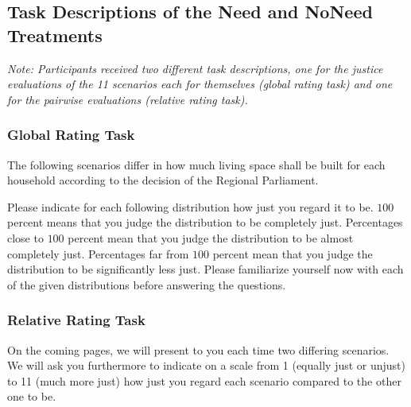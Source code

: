 \documentclass[12pt]{scrartcl}
\begin{document}
\subsection*{Task Descriptions of the Need and NoNeed Treatments}
\textit{Note: Participants received two different task descriptions, one for the justice evaluations of the 11 scenarios each for themselves (global rating task) and one for the pairwise evaluations (relative rating task).}

\subsubsection*{Global Rating Task}
The following scenarios differ in how much living space shall be built for each household according to the decision of the Regional Parliament.

Please indicate for each following distribution how just you regard it to be.
$100$ percent means that you judge the distribution to be completely just.
Percentages close to $100$ percent mean that you judge the distribution to be almost completely just.
Percentages far from $100$ percent mean that you judge the distribution to be significantly less just.
Please familiarize yourself now with each of the given distributions before answering the questions.

\subsubsection*{Relative Rating Task}
On the coming pages, we will present to you each time two differing scenarios.
We will ask you furthermore to indicate on a scale from 1 (equally just or unjust) to 11 (much more just) how just you regard each scenario compared to the other one to be.
\end{document}
